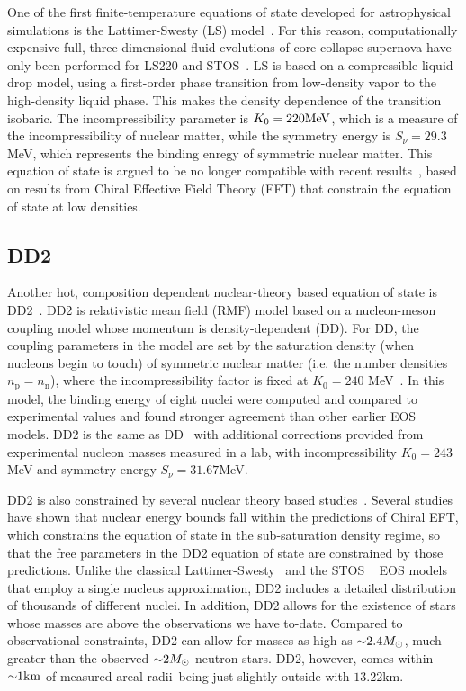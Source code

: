 One of the first finite-temperature equations of state developed for astrophysical simulations is the Lattimer-Swesty (LS) model~\cite{Lattimer:1991nc}.  
For this reason, computationally expensive full, three-dimensional fluid evolutions of core-collapse supernova have only been performed for LS220 and STOS~\cite{Marek2009}.
LS is based on a compressible liquid drop model, using a first-order phase transition from low-density vapor to the high-density liquid phase.  
This makes the density dependence of the transition isobaric.  
The incompressibility parameter is $K_0 = 220 {\rm MeV}$, which is a measure of the incompressibility of nuclear matter, while the symmetry energy is $S_\nu = 29.3$MeV, which represents the binding enregy of symmetric nuclear matter.
This equation of state is argued to be no longer compatible with recent results~\cite{Fischer2014}, based on results from Chiral Effective Field Theory (EFT) that constrain the equation of state at low densities.

\subsection{DD2}
\label{sec:dd2}

Another hot, composition dependent nuclear-theory based equation of state is DD2~\cite{typel2010composition}.  DD2 is relativistic mean field (RMF) model based on a nucleon-meson coupling model whose momentum is density-dependent (DD).  
For DD, the coupling parameters in the model are set by the saturation density (when nucleons begin to touch) of symmetric nuclear matter (i.e. the number densities $n_\textrm{p} = n_\textrm{n}$), where the incompressibility factor is fixed at $K_0 = 240$ MeV~\cite{typel2005relativistic}.
In this model, the binding energy of eight nuclei were computed and compared to experimental values and found stronger agreement than other earlier EOS models.
DD2 is the same as DD~\cite{typel2005relativistic} with additional corrections provided from experimental nucleon masses measured in a lab, with incompressibility $K_0 = 243$MeV and symmetry energy $S_\nu=31.67$MeV.

DD2 is also constrained by several nuclear theory based studies~\cite{hempel2012new}.
Several studies have shown that nuclear energy bounds fall within the predictions of Chiral EFT, which constrains the equation of state in the sub-saturation density regime, so that the free parameters in the DD2 equation of state are constrained by those predictions. 
Unlike the classical Lattimer-Swesty~\cite{Lattimer:1991nc} and the STOS ~\cite{Shen:1998gq} EOS models that employ a single nucleus approximation, DD2 includes a detailed distribution of thousands of different nuclei.
In addition, DD2 allows for the existence of stars whose masses are above the observations we have to-date.
Compared to observational constraints, DD2 can allow for masses as high as $\mathord{\sim} 2.4 M_\odot$, much greater than the observed $\mathord{\sim} 2 M_\odot$ neutron stars.
DD2, however, comes within $\mathord{\sim} 1 \textrm{km}$ of measured areal radii--being just slightly outside with $13.22 \textrm{km}$.

